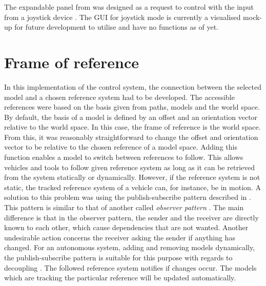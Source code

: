 The expandable panel from  was designed as a request to control with the input from a joystick device \cite{joystick}. The GUI for joystick mode is currently a visualised mock-up for future development to utilise and have no functions as of yet.

\section{Frame of reference}

In this implementation of the control system, the connection between the selected model and a chosen reference system had to be developed. The accessible references were based on the basis given from paths, models and the world space. By default, the basis of a model is defined by an offset and an orientation vector relative to the world space. In this case, the frame of reference is the world space. From this, it was reasonably straightforward to change the offset and orientation vector to be relative to the chosen reference of a model space. Adding this function enables a model to switch between references to follow. This allows vehicles and tools to follow given reference system as long as it can be retrieved from the system statically or dynamically. However, if the reference system is not static, the tracked reference system of a vehicle can, for instance, be in motion. A solution to this problem was using the publish-subscribe pattern described in . This pattern is similar to that of another called \textit{observer pattern} \cite{observer_pattern}. The main difference is that in the observer pattern, the sender and the receiver are directly known to each other, which cause dependencies that are not wanted. Another undesirable action concerns the receiver asking the sender if anything has changed. For an autonomous system, adding and removing models dynamically, the publish-subscribe pattern is suitable for this purpose with regards to decoupling \cite{decoupling}. The followed reference system notifies if changes occur. The models which are tracking the particular reference will be updated automatically.  

